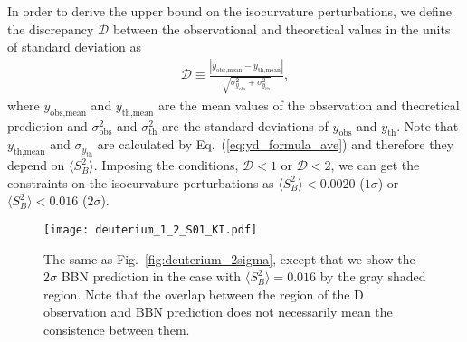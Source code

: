 \documentclass[11pt,a4paper]{article}
\begin{document}
In order to derive the upper bound on the isocurvature perturbations, 
we define the discrepancy $\mathcal{D}$ between the observational and theoretical values in the units of standard deviation as 
\begin{align}
\mathcal{D} \equiv 
\frac{|y_\text{obs,mean} - y_\text{th,mean}|}{\sqrt{\sigma^2_{y_\text{obs}} + \sigma^2_{y_\text{th}}}},
\label{eq:disc_formula}           
\end{align}
where $y_\text{obs,mean}$ and $y_\text{th,mean}$ are the mean values of the observation and theoretical prediction 
and $\sigma^2_\text{obs}$ and $\sigma^2_\text{th}$ are the standard deviations of $y_\text{obs}$ and $y_\text{th}$.
Note that $y_\text{th,mean}$ and $\sigma_{y_\text{th}}$ are calculated by Eq.~(\ref{eq:yd_formula_ave}) and therefore they depend on $\langle S_{B}^2 \rangle$.
Imposing the conditions, $\mathcal{D}<1 $ or $\mathcal{D}<2$, we can get the constraints on the isocurvature perturbations as $\langle S_B^2 \rangle < 0.0020$ ($1\sigma$) or $\langle S_B^2 \rangle < 0.016$ ($2\sigma$).


\begin{figure}
  \centering \texttt{[image: deuterium\_1\_2\_S01\_KI.pdf]}
  \caption{%
	The same as Fig.~\ref{fig:deuterium_2sigma}, except that we show the $2 \sigma$ BBN prediction in the case with $\langle S_B^2 \rangle =0.016$ by the gray shaded region.
    Note that the overlap between the region of the D observation and BBN prediction does not necessarily mean the consistence between them.
	}
  \label{fig:deuterium_S01_2sigma}
\end{figure}
\end{document}

